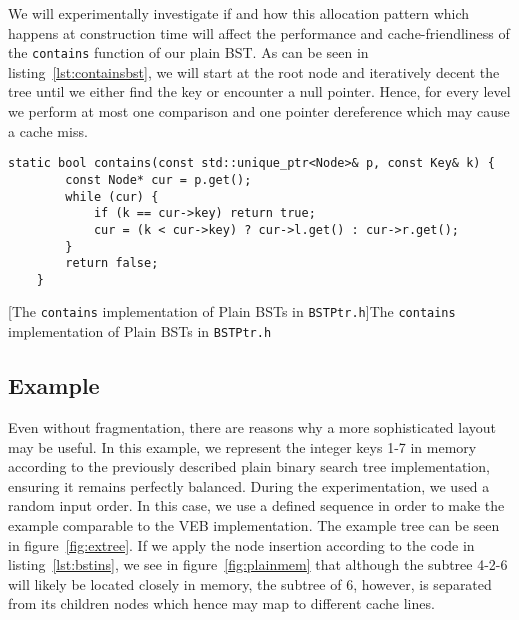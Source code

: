 \documentclass{article}
\begin{document}
We will experimentally investigate if and how this allocation pattern which happens at construction time will affect the performance and cache-friendliness of the \texttt{contains} function of our plain BST. As can be seen in listing~\ref{lst:containsbst}, we will start at the root node and iteratively decent the tree until we either find the key or encounter a null pointer. Hence, for every level we perform at most one comparison and one pointer dereference which may cause a cache miss. 
\begin{lstlisting}
static bool contains(const std::unique_ptr<Node>& p, const Key& k) {
        const Node* cur = p.get();
        while (cur) {
            if (k == cur->key) return true;
            cur = (k < cur->key) ? cur->l.get() : cur->r.get();
        }
        return false;
    }
\end{lstlisting}
[The \texttt{contains} implementation of Plain BSTs in \texttt{BSTPtr.h}]{The \texttt{contains} implementation of Plain BSTs in \texttt{BSTPtr.h}}
\label{lst:containsbst}

\subsection{Example}
\label{secsec:explain}
Even without fragmentation, there are reasons why a more sophisticated layout may be useful. In this example, we represent the integer keys 1-7 in memory according to the previously described plain binary search tree implementation, ensuring it remains perfectly balanced. During the experimentation, we used a random input order. In this case, we use a defined sequence in order to make the example comparable to the VEB implementation. The example tree can be seen in figure~\ref{fig:extree}. If we apply the node insertion according to the code in listing~\ref{lst:bstins}, we see in figure~\ref{fig:plainmem} that although the subtree 4-2-6 will likely be located closely in memory, the subtree of 6, however, is separated from its children nodes which hence may map to different cache lines. 


\end{document}
